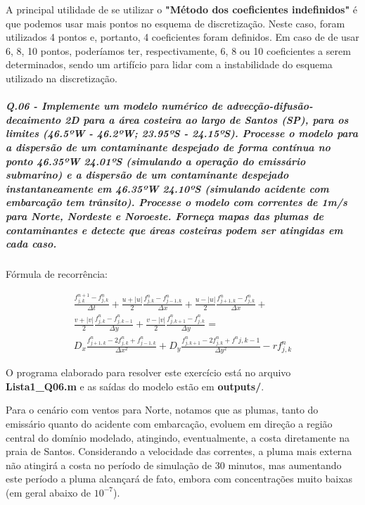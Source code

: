 \documentclass[11pt]{article}
\begin{document}
A principal utilidade de se utilizar o \textbf{"Método dos coeficientes
indefinidos"} é que podemos usar mais pontos no esquema de
discretização. Neste caso, foram utilizados 4 pontos e, portanto, 4
coeficientes foram definidos. Em caso de de usar 6, 8, 10 pontos,
poderíamos ter, respectivamente, 6, 8 ou 10 coeficientes a serem
determinados, sendo um artifício para lidar com a instabilidade do
esquema utilizado na discretização.

    \subparagraph{Q.06 - Implemente um modelo numérico de
advecção-difusão-decaimento 2D para a área costeira ao largo de Santos
(SP), para os limites (46.5ºW - 46.2ºW; 23.95ºS - 24.15ºS). Processe o
modelo para a dispersão de um contaminante despejado de forma contínua
no ponto 46.35ºW 24.01ºS (simulando a operação do emissário submarino) e
a dispersão de um contaminante despejado instantaneamente em 46.35ºW
24.10ºS (simulando acidente com embarcação tem trânsito). Processe o
modelo com correntes de 1m/s para Norte, Nordeste e Noroeste. Forneça
mapas das plumas de contaminantes e detecte que áreas costeiras podem
ser atingidas em cada
caso.}

Fórmula de recorrência:

\begin{equation}
\begin{aligned}
    \frac{f^{n+1}_{j,k} - f^{n}_{j,k}}{\Delta{t}} + \frac{u + |u|}{2}\frac{f^{n}_{j,k} - f^{n}_{j-1,k}}{\Delta{x}} + \frac{u - |u|}{2}\frac{f^{n}_{j+1,k} - f^{n}_{j,k}}{\Delta{x}} + \\
    \frac{v + |v|}{2}\frac{f^{n}_{j,k} - f^{n}_{j,k-1}}{\Delta{y}} + \frac{v - |v|}{2}\frac{f^{n}_{j,k+1} - f^{n}_{j,k}} {\Delta{y}} = \\
    D_x\frac{f^{n}_{j+1,k} - 2f^{n}_{j,k} + f^{n}_{j-1,k}}{\Delta{x^2}} + D_y\frac{f^{n}_{j,k+1} - 2f^{n}_{j,k} + f^{n}{j,k-1}}{\Delta{y^2}} - rf^{n}_{j,k}
\end{aligned}
\end{equation}

O programa elaborado para resolver este exercício está no arquivo
\textbf{Lista1\_Q06.m} e as saídas do modelo estão em \textbf{outputs/}.

Para o cenário com ventos para Norte, notamos que as plumas, tanto do
emissário quanto do acidente com embarcação, evoluem em direção a região
central do domínio modelado, atingindo, eventualmente, a costa
diretamente na praia de Santos. Considerando a velocidade das correntes,
a pluma mais externa não atingirá a costa no período de simulação de 30
minutos, mas aumentando este período a pluma alcançará de fato, embora
com concentrações muito baixas (em geral abaixo de \(10^{-7}\)).
\end{document}
